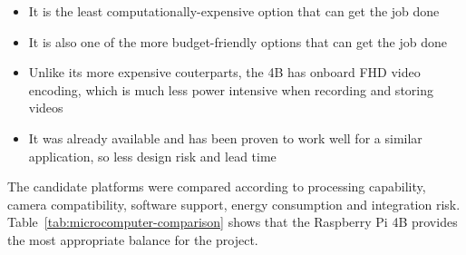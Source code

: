 \begin{itemize}
    \item It is the least computationally-expensive option that can get the job done
    \item It is also one of the more budget-friendly options that can get the job done
    \item Unlike its more expensive couterparts, the 4B has onboard FHD video encoding, which is much less power intensive when recording and storing videos
    \item It was already available and has been proven to work well for a similar application, so less design risk and lead time
\end{itemize}

The candidate platforms were compared according to processing capability, camera compatibility, software support, energy consumption and integration risk. Table~\ref{tab:microcomputer-comparison} shows that the Raspberry Pi 4B provides the most appropriate balance for the project.


